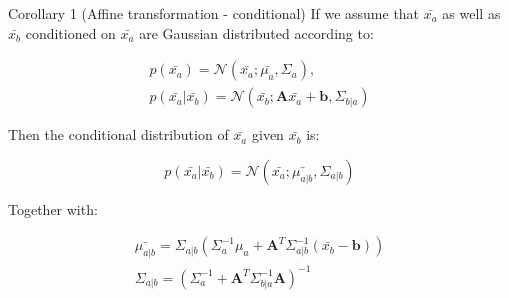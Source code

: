 \begin{wbox}{Corollary 1 (Affine transformation - conditional)}
    If we assume that $\bar{x_a}$ as well as $\bar{x_b}$ conditioned on $\bar{x_a}$ are Gaussian distributed according to:

    \begin{equation}
    \begin{aligned}
        p(\bar{x_a}) = \mathcal{N}(\bar{x_a}; \bar{\mu_a}, \Sigma_a), \\
        p(\bar{x_a}|\bar{x_b}) = \mathcal{N}(\bar{x_b}; \textbf{A}\bar{x_a} + \textbf{b}, \Sigma_{b|a} )  
    \end{aligned}
    \end{equation}

    Then the conditional distribution of $\bar{x_a}$ given $\bar{x_b}$  is:

    \begin{equation}
        p(\bar{x_a}|\bar{x_b}) = \mathcal{N}(\bar{x_a}; \bar{\mu_{a|b}}, \Sigma_{a|b})
    \end{equation}

    Together with:

    \begin{equation}
    \begin{aligned}
        \bar{{\mu_{a|b}}} = \Sigma_{a|b} (\Sigma_a^{-1}\mu_{a} + \textbf{A}^{T} \Sigma^{-1}_{a|b}(\bar{x_b} - \textbf{b})) \\
        \Sigma_{a|b} = (\Sigma_a^{-1} + \textbf{A}^{T} \Sigma_{b|a}^{-1}\textbf{A})^{-1} 
    \end{aligned}
    \end{equation}
\end{wbox}

